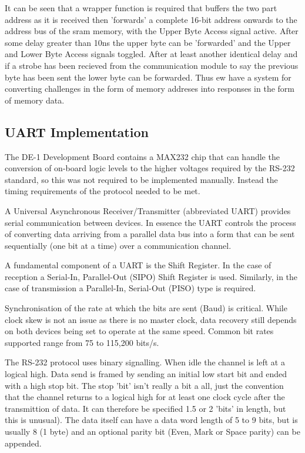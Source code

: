 It can be seen that a wrapper function is required that buffers the two part address
as it is received then 'forwards' a complete 16-bit address onwards to 
the address bus of the \gls{sram} memory, with the Upper Byte Access signal active.
After some delay greater than 10ns the upper byte can be 'forwarded' and the
Upper and Lower Byte Access signals toggled. After at least another identical delay
and if a strobe has been recieved from the communication module to say the previous
byte has been sent the lower byte can be forwarded. Thus ew have a system for
converting challenges in the form of memory addreses into responses in the form of
memory data. 

\subsection{UART Implementation}

The DE-1 Development Board contains a MAX232 chip that can handle the 
conversion of on-board logic levels to the higher voltages required by the
RS-232 standard, so this was not required to be implemented manually.
Instead the timing requirements of the protocol needed to be met.

A Universal Asynchronous Receiver/Transmitter (abbreviated UART) provides
serial communication between devices. In essence the UART controls the process
of converting data arriving from a parallel data bus into a form that can
be sent sequentially (one bit at a time) over a communication channel.

A fundamental component of a UART is the Shift Register. In the case of 
reception a Serial-In, Parallel-Out (SIPO) Shift Register is used.
Similarly, in the case of transmission a Parallel-In, Serial-Out (PISO)
type is required.

Synchronisation of the rate at which the bits are sent (Baud) is critical.
While clock skew is not an issue as there is no master clock, data recovery
still depends on both devices being set to operate at the same speed.
Common bit rates supported range from 75 to 115,200 bits/s.

The RS-232 protocol uses binary signalling. When idle the channel is left at
a logical high.
Data send is framed by sending an initial low start bit and ended with a
high stop bit. The stop 'bit' isn't really a bit a all, just the convention
that the channel returns to a logical high for at least one clock cycle
after the transmittion of data.
It can therefore be specified 1.5 or 2 'bits' in length, but this is unusual).
The data itself can have a data word length of 5 to 9 bits, but is usually
8 (1 byte) and an optional parity bit (Even, Mark or Space parity) 
can be appended.

